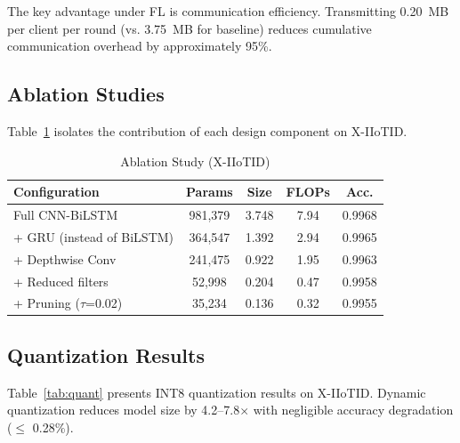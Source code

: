 \documentclass[10pt,journal]{IEEEtran}
\begin{document}
The key advantage under FL is communication efficiency. Transmitting 0.20~MB per client per round (vs. 3.75~MB for baseline) reduces cumulative communication overhead by approximately 95\%.

\subsection{Ablation Studies}

Table~\ref{tab:ablation} isolates the contribution of each design component on X-IIoTID.

\begin{table}[t]
\centering
\caption{Ablation Study (X-IIoTID)}
\label{tab:ablation}
\begin{tabular}{lcccc}
\toprule
Configuration & Params & Size & FLOPs & Acc. \\
\midrule
Full CNN-BiLSTM & 981,379 & 3.748 & 7.94 & 0.9968 \\
+ GRU (instead of BiLSTM) & 364,547 & 1.392 & 2.94 & 0.9965 \\
+ Depthwise Conv & 241,475 & 0.922 & 1.95 & 0.9963 \\
+ Reduced filters & 52,998 & 0.204 & 0.47 & 0.9958 \\
+ Pruning ($\tau$=0.02) & 35,234 & 0.136 & 0.32 & 0.9955 \\
\bottomrule
\end{tabular}
\end{table}

\subsection{Quantization Results}

Table~\ref{tab:quant} presents INT8 quantization results on X-IIoTID. Dynamic quantization reduces model size by 4.2--7.8$\times$ with negligible accuracy degradation ($\le$ 0.28\%).

\begin{table}[t]
\centering\footnotesize
\caption{INT8 Quantization Results (X-IIoTID)}
\label{tab:quant}
\end{table}
\end{document}
